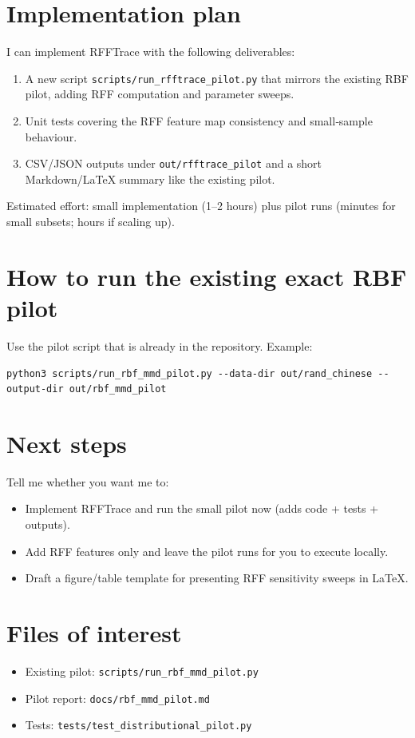\documentclass[11pt,a4paper]{article}
\begin{document}
\section{Implementation plan}
I can implement RFFTrace with the following deliverables:
\begin{enumerate}
  \item A new script \texttt{scripts/run\_rfftrace\_pilot.py} that mirrors the existing RBF pilot, adding RFF computation and parameter sweeps.
  \item Unit tests covering the RFF feature map consistency and small‑sample behaviour.
  \item CSV/JSON outputs under \texttt{out/rfftrace\_pilot} and a short Markdown/LaTeX summary like the existing pilot.
\end{enumerate}

Estimated effort: small implementation (1–2 hours) plus pilot runs (minutes for small subsets; hours if scaling up).

\section{How to run the existing exact RBF pilot}
Use the pilot script that is already in the repository. Example:
\begin{verbatim}
python3 scripts/run_rbf_mmd_pilot.py --data-dir out/rand_chinese --output-dir out/rbf_mmd_pilot
\end{verbatim}

\section{Next steps}
Tell me whether you want me to:
\begin{itemize}
  \item Implement RFFTrace and run the small pilot now (adds code + tests + outputs).
  \item Add RFF features only and leave the pilot runs for you to execute locally.
  \item Draft a figure/table template for presenting RFF sensitivity sweeps in LaTeX.
\end{itemize}

\section{Files of interest}
\begin{itemize}
  \item Existing pilot: \texttt{scripts/run\_rbf\_mmd\_pilot.py}
  \item Pilot report: \texttt{docs/rbf\_mmd\_pilot.md}
  \item Tests: \texttt{tests/test\_distributional\_pilot.py}
\end{itemize}
\end{document}
